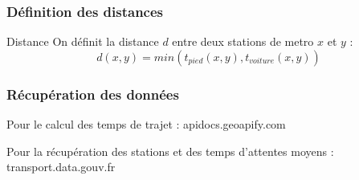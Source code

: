 \documentclass{beamer}
\begin{document}
\begin{frame}
    \frametitle{Définition des distances}
    
    \begin{block}{Distance}
        On définit la distance $d$ entre deux stations de metro $x$ et $y$ : 
        $$ d(x,y) =  min(t_{pied}(x,y), t_{voiture}(x,y))$$
    \end{block}
\end{frame}

\begin{frame}
    \frametitle{Récupération des données}
    Pour le calcul des temps de trajet :  apidocs.geoapify.com

    Pour la récupération des stations et des temps d'attentes moyens : transport.data.gouv.fr
\end{frame}
\end{document}

